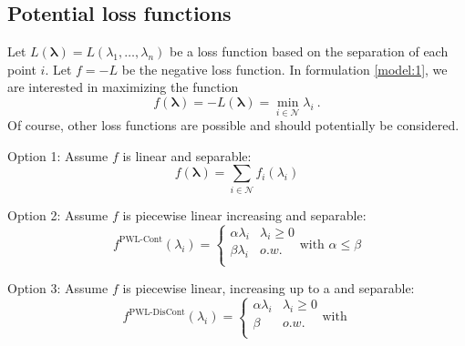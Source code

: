 \documentclass[]{article}
\newcommand{\mc}{\mathcal}
\newcommand{\vlambda}{\boldsymbol{\lambda}}
\begin{document}
\subsection{Potential loss functions}

Let $L(\vlambda) = L(\lambda_1,\dots,\lambda_n)$ be a loss function based on the separation of each point $i$. 
Let $f = -L$ be the negative loss function.
In formulation \eqref{model:1}, we are interested in maximizing the function 
$$
f(\vlambda) = -L(\vlambda) = \min_{i \in \mc{N}} \lambda_i~.
$$
Of course, other loss functions are possible and should potentially be considered.

Option 1: Assume $f$ is linear and separable: 
\begin{equation}
f(\vlambda) = \sum_{i \in \mc{N}} f_i(\lambda_i)
\end{equation}

Option 2: Assume $f$ is piecewise linear increasing and separable: 
\begin{equation}
f^{\textrm{PWL-Cont}}(\lambda_i) = \left\{
\begin{array}{ll}
\alpha \lambda_i & \lambda_i \geq 0 \\
\beta \lambda_i & o.w. \\
\end{array}
\right.
\textrm{with } \alpha \leq \beta
\end{equation}

Option 3: Assume $f$ is piecewise linear, increasing up to a  and separable: 
\begin{equation}
f^{\textrm{PWL-DisCont}}(\lambda_i) = \left\{
\begin{array}{ll}
\alpha \lambda_i & \lambda_i \geq 0 \\
\beta & o.w. \\
\end{array}
\right.
\textrm{with }
\end{equation}
 
\end{document}
